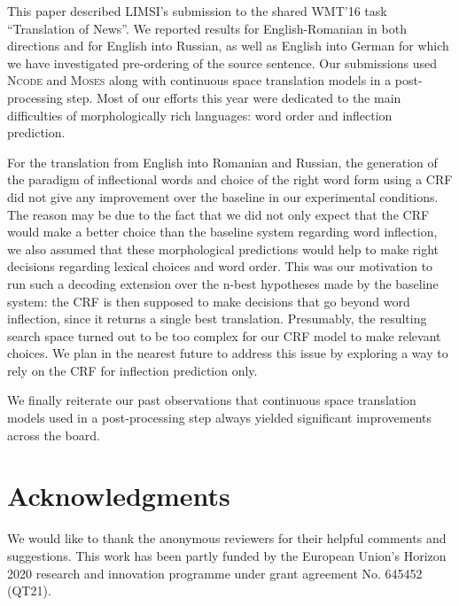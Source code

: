 \documentclass[11pt]{article}
\newcommand{\ncode}{\textsc{Ncode}\xspace}
\newcommand{\moses}{\textsc{Moses}\xspace}
\begin{document}
This paper described LIMSI's submission to the shared WMT'16 task
``Translation of News''. We reported results for English-Romanian
in both directions and for English into Russian, as well as English
into German for which we have investigated pre-ordering of the source
sentence. Our
submissions used \ncode and \moses along with continuous space
translation models in a post-processing step. Most of our efforts
this year were dedicated to the main difficulties of morphologically
rich languages: word order and inflection prediction.

For the translation from English into Romanian and Russian, the
generation of the paradigm of inflectional words and choice of the
right word form using a CRF did not give any improvement over the
baseline in our experimental conditions. The reason may be due to the fact that we did not only expect that the
CRF would make a better choice than the baseline system regarding
word inflection, we also assumed that these morphological predictions
would help to make right decisions regarding lexical choices and word order.
This was our motivation to run such a decoding extension over
the n-best hypotheses made by the baseline system: the CRF is
then supposed to make decisions that go beyond word inflection,
since it returns a single best translation.
Presumably, the resulting search space turned
out to be too complex for our CRF model to make relevant choices. We plan in the nearest
future to address this issue by exploring a way to rely on the CRF
for inflection prediction only.

We finally reiterate our past observations that
continuous space translation models used in a
post-processing step always yielded significant
improvements across the board.

\section{Acknowledgments}

We would like to thank the anonymous reviewers for their helpful comments and suggestions. 
This work has been partly funded by the European Union’s Horizon 2020 research
and innovation programme under grant agreement No. 645452 (QT21).



\end{document}
